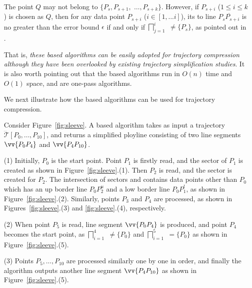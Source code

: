 The point $Q$ may not belong to $\{P_{s}, P_{s+1},$ $\ldots, P_{s+k}\}$.
However, if $P_{s+i}$ ($1\le i\le k$) is chosen as $Q$, then
for any data point $P_{s+i}$ ($i \in [1, ... i]$), its \ped to
line $\overline{P_sP_{s+i}}$ is no greater than the error bound $\epsilon$ if and only if $\bigsqcap_{j=1}^{i}$ $\ne \{P_s\}$, as pointed out in \cite{Zhao:Sleeve}.

 That is, {\em these \cia based algorithms can be easily adopted for trajectory compression although they have been overlooked by existing trajectory simplification studies}.  It is also worth pointing out that the \cia based algorithms  run in $O(n)$ time and $O(1)$ space, and are one-pass algorithms.

We next illustrate how the \cia based algorithms can be used for trajectory compression.



\begin{example}
\label{exm-alg-sleeve}
Consider Figure~\ref{fig:sleeve}. A \cia based algorithm takes as input a trajectory $\dddot{\mathcal{T}}[P_0, \ldots, P_{10}]$, and returns a simplified ployline consisting of two line segments $\vv{P_0P_4}$ and  $\vv{P_4P_{10}}$.

\sstab(1) Initially, $P_0$ is the start point. Point $P_1$ is firstly read, and the sector  of $P_1$ is created as shown in Figure~\ref{fig:sleeve}.(1).
Then $P_2$ is read, and the sector   is created for $P_2$. The intersection of sectors  and   contains data points other than $P_0$  which has an up border line $P_0P_2^u$ and a low border line $P_0P_1^l$, as shown in Figure~\ref{fig:sleeve}.(2).
Similarly, points $P_3$ and $P_4$ are processed, as shown in Figures~\ref{fig:sleeve}.(3) and \ref{fig:sleeve}.(4), respectively.

\sstab(2) When point $P_5$ is read,  line segment $\vv{P_0P_4}$ is produced, and point $P_4$ becomes the start point, as $\bigsqcap_{i=1}^{4}$ $\ne\{P_0\}$ and $\bigsqcap_{i=1}^{5}$ $=\{P_0\}$ as shown in Figure~\ref{fig:sleeve}.(5).


\sstab(3) Points $P_5, \ldots, P_{10}$ are processed similarly one by one in order, and finally the algorithm outputs another line segment $\vv{P_4P_{10}}$ as shown in Figure~\ref{fig:sleeve}.(5).
\end{example}




